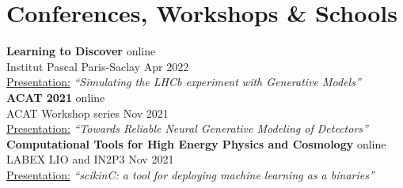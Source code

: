 \newcommand{\event}[2]
  {\normalsize \textbf{\color{hlcolor-0} #1} \hfill {\color{hlcolor-2} #2}}
  
\newcommand{\organizer}[2]
  {\small \color{hlcolor-1} {#1} \hfill {#2}}
  
\newcommand{\contribution}[3][]
  {\normalsize \color{maincolor} \ul{#2:} \emph{``#3''} {#1}}
  
\newcommand{\theme}[1]
  {\normalsize \color{maincolor} \ul{School Theme:} \emph{#1}}
  
\newcommand{\button}[2]
  {\large \color{maincolor} \href{#1}{#2}}
  

\section*{Conferences, Workshops \& Schools}
\begin{cvcontent}
  \event{Learning to Discover}{online}\\
  \organizer{Institut Pascal Paris-Saclay}{Apr 2022}\\
  \contribution{Presentation}{Simulating the LHCb experiment with Generative Models} \hfill
  \button{https://indico.ijclab.in2p3.fr/event/5999/contributions/25660/attachments/18780/25338/Matteo_Barbetti_LTD2022.mp4}{\faFilm}
  \button{https://indico.ijclab.in2p3.fr/event/5999/contributions/25660/attachments/18780/25270/LTD_mbarbetti_sim_lhcb_with_gm.pdf}{\faFilePdf[regular]}
  \button{https://indico.ijclab.in2p3.fr/event/5999/}{\faGlobe}
  \\ [4mm]
  \event{ACAT 2021}{online}\\
  \organizer{ACAT Workshop series}{Nov 2021}\\
  \contribution{Presentation}{Towards Reliable Neural Generative Modeling of Detectors} \hfill
  \button{https://videos.cern.ch/record/2295070}{\faFilm}
  \button{https://indico.cern.ch/event/855454/contributions/4597413/attachments/2355449/4019660/Mokhnenko\%20ACAT\%202021.pdf}{\faFilePdf[regular]}
  \button{https://indico.cern.ch/event/855454/}{\faGlobe}
  \\ [4mm]
  \event{Computational Tools for High Energy Physics and Cosmology}{online}\\
  \organizer{LABEX LIO and IN2P3}{Nov 2021}\\
  \contribution{Presentation}{scikinC: a tool for deploying machine learning as a binaries} \hfill

\end{cvcontent}
